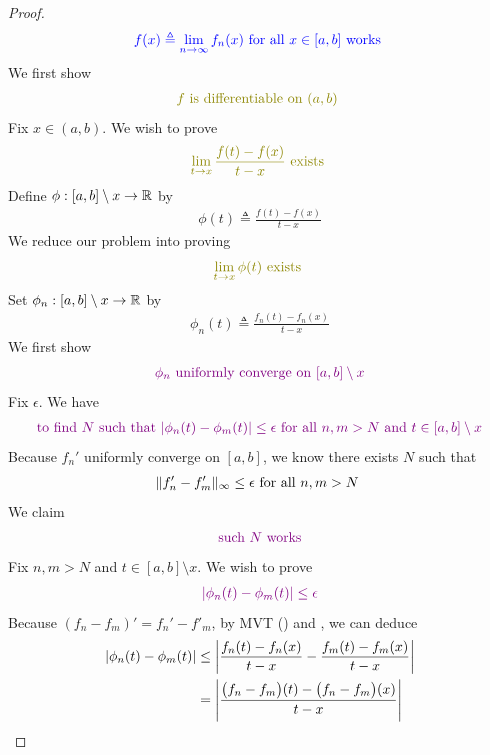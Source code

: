\documentclass{report}
\begin{document}
\begin{proof}
\begin{align}
\textcolor{blue}{f(x)\triangleq \lim_{n\to \infty}f_n(x)\text{ for all $x \in [a,b]$ works }}
\end{align}
We first show 
\begin{align*}
\olive{f\text{ is differentiable on $(a,b)$ }}
\end{align*}
Fix $x \in (a,b)$. We wish to prove
\begin{align*}
  \olive{{\lim_{t\to x}\frac{f(t)-f(x)}{t-x}\text{ exists }}}
\end{align*}
Define $\phi :[a,b]\setminus x\rightarrow \mathbb{R}$ by 
\begin{align*}
\phi (t)\triangleq \frac{f(t)-f(x)}{t-x}
\end{align*}
We reduce our problem into proving 
\begin{align*}
  \olive{\lim_{t\to x}\phi (t)\text{ exists }}
\end{align*}
Set $\phi_n:[a,b]\setminus x\rightarrow \mathbb{R}$ by 
\begin{align*}
\phi_n(t)\triangleq \frac{f_n(t)-f_n(x)}{t-x}
\end{align*}
We first show  
\begin{align}
\label{UCACu}
  \textcolor{violet}{\phi_n\text{ uniformly converge on }[a,b]\setminus x}
\end{align}
Fix $\epsilon $. We have
\begin{align*}
  \textcolor{violet}{\text{ to find $N$ such that  $\left|\phi_n(t)-\phi _m(t)\right|\leq \epsilon $ for all $n,m>N$ and  $t\in [a,b]\setminus x$ }}
\end{align*}
Because $f_n'$ uniformly converge on  $[a,b]$, we know there exists $N$ such that 
 \begin{align}
\label{CUaC1}
\| f_n'-f_m' \|_\infty\leq \epsilon \text{ for all $n,m>N$ }
\end{align}
We claim 
\begin{align*}
\textcolor{violet}{\text{ such }N\text{ works }}
\end{align*}
Fix $n,m>N$ and $t \in [a,b]\setminus x$. We wish to prove 
\begin{align*}
\textcolor{violet}{\left|\phi_n(t)-\phi_m(t)\right|\leq \epsilon }
\end{align*}
Because $(f_n-f_m)'=f_n'-f'_m$, by MVT () and , we can deduce 
\begin{align*}
  \abso{\phi_n(t)-\phi_m(t)}&\leq \abso{\frac{f_n(t)-f_n(x)}{t-x}-\frac{f_m(t)-f_m(x)}{t-x}}\\
                            &=\abso{\frac{\big(f_n-f_m\big)(t)-\big(f_n-f_m\big)(x)}{t-x}}\\

\end{align*}
\end{proof}
\end{document}
